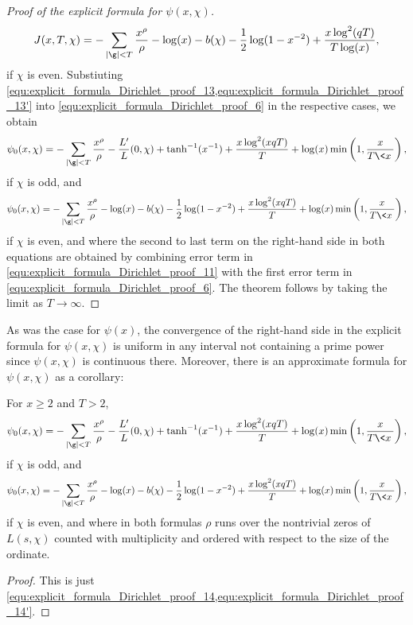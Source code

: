\begin{proof}[Proof of the explicit formula for $\psi(x,\chi)$]
\begin{equation}
          J(x,T,\chi) = -\sum_{|\g| < T}\frac{x^{\rho}}{\rho}-\log(x)-b(\chi)-\frac{1}{2}\log(1-x^{-2})+\frac{x\log^{2}(qT)}{T\log(x)},
        \end{equation}
        if $\chi$ is even.
        Substiuting \cref{equ:explicit_formula_Dirichlet_proof_13,equ:explicit_formula_Dirichlet_proof_13'} into \cref{equ:explicit_formula_Dirichlet_proof_6} in the respective cases, we obtain
        \begin{equation}\label{equ:explicit_formula_Dirichlet_proof_14}
          \psi_{0}(x,\chi) = -\sum_{|\g| < T}\frac{x^{\rho}}{\rho}-\frac{L'}{L}(0,\chi)+\tanh^{-1}(x^{-1})+\frac{x\log^{2}(xqT)}{T}+\log(x)\min\left(1,\frac{x}{T\<x\>}\right),
        \end{equation}
        if $\chi$ is odd, and
        \begin{equation}\label{equ:explicit_formula_Dirichlet_proof_14'}
          \psi_{0}(x,\chi) = -\sum_{|\g| < T}\frac{x^{\rho}}{\rho}-\log(x)-b(\chi)-\frac{1}{2}\log(1-x^{-2})+\frac{x\log^{2}(xqT)}{T}+\log(x)\min\left(1,\frac{x}{T\<x\>}\right),
        \end{equation}
        if $\chi$ is even, and where the second to last term on the right-hand side in both equations are obtained by combining error term in \cref{equ:explicit_formula_Dirichlet_proof_11} with the first error term in \cref{equ:explicit_formula_Dirichlet_proof_6}. The theorem follows by taking the limit as $T \to \infty$.
      \end{proof}

      As was the case for $\psi(x)$, the convergence of the right-hand side in the explicit formula for $\psi(x,\chi)$ is uniform in any interval not containing a prime power since $\psi(x,\chi)$ is continuous there. Moreover, there is an approximate formula for $\psi(x,\chi)$ as a corollary:

      \begin{corollary}\label{cor:explicit_formula_Dirichlet_corollary}
         For $x \ge 2$ and $T > 2$,
        \[
          \psi_{0}(x,\chi) = -\sum_{|\g| < T}\frac{x^{\rho}}{\rho}-\frac{L'}{L}(0,\chi)+\tanh^{-1}(x^{-1})+\frac{x\log^{2}(xqT)}{T}+\log(x)\min\left(1,\frac{x}{T\<x\>}\right),
        \]
        if $\chi$ is odd, and
        \[
           \psi_{0}(x,\chi) = -\sum_{|\g| < T}\frac{x^{\rho}}{\rho}-\log(x)-b(\chi)-\frac{1}{2}\log(1-x^{-2})+\frac{x\log^{2}(xqT)}{T}+\log(x)\min\left(1,\frac{x}{T\<x\>}\right),
        \]
        if $\chi$ is even, and where in both formulas $\rho$ runs over the nontrivial zeros of $L(s,\chi)$ counted with multiplicity and ordered with respect to the size of the ordinate.
      \end{corollary}
      \begin{proof}
        This is just \cref{equ:explicit_formula_Dirichlet_proof_14,equ:explicit_formula_Dirichlet_proof_14'}.
      \end{proof}

